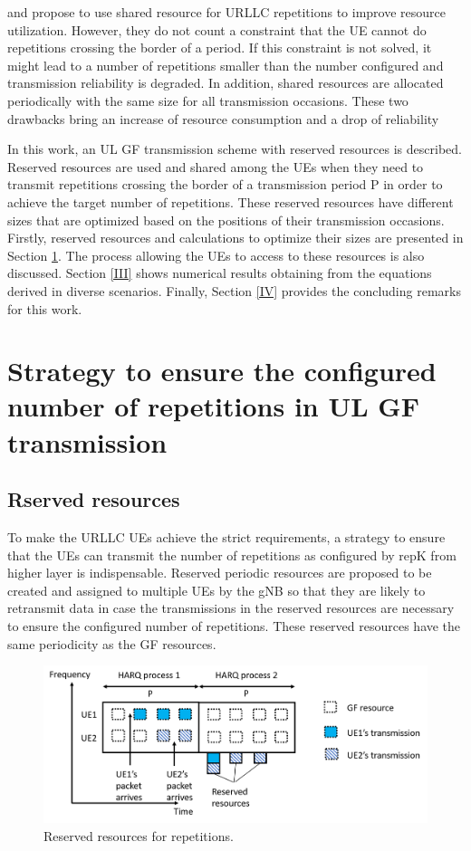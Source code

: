 \documentclass[conference]{IEEEtran}
\begin{document}
\cite{b5} and \cite{b7} propose to use shared resource for URLLC repetitions to improve resource utilization. However, they do not count a constraint that the UE cannot do repetitions crossing the border of a period. If this constraint is not solved, it might lead to a number of repetitions smaller than the  number configured and transmission reliability is degraded. In addition, shared resources are allocated periodically with the same size for all transmission occasions. These two drawbacks bring an increase of resource consumption and a drop of reliability 

In this work, an UL GF transmission scheme with reserved resources is described. Reserved resources are used and shared among the UEs when they need to transmit repetitions crossing the border of a transmission period P in order to achieve the target number of repetitions. These reserved resources have different sizes that are optimized based on the positions of their transmission occasions.  
Firstly, reserved resources and calculations to optimize their sizes are presented in Section \ref{II}. The process allowing the UEs to access to these resources is also discussed. Section \ref{III} shows numerical results obtaining from the equations derived in diverse scenarios. Finally, Section \ref{IV} provides the concluding remarks for this work.

\section{Strategy to ensure the configured number of repetitions in UL GF transmission}\label{II}

\subsection{Rserved resources}\label{IIAA}
To make the URLLC UEs achieve the strict requirements, a strategy to ensure that the UEs can transmit the number of repetitions as configured by repK from higher layer is indispensable. Reserved periodic resources are proposed to be created and assigned to multiple UEs by the gNB so that they are likely to retransmit data in case the transmissions in the reserved resources are necessary to ensure the configured number of repetitions. These reserved resources have the same periodicity as the GF resources.

\begin{figure}[htbp]
\centerline{\includegraphics[scale=0.30]{fig2.png}}
\caption{Reserved resources for repetitions.}
\label{fig2}
\end{figure}
\end{document}
